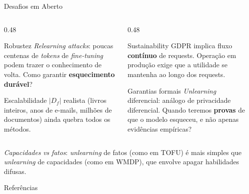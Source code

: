 \documentclass[aspectratio=169,xcolor=dvipsnames]{beamer}
\begin{document}
  \begin{frame}{Desafios em Aberto}
    \begin{columns}[T]
      \begin{column}{0.48\textwidth}
        \begin{block}{Robustez}
          \textit{Relearning attacks}: poucas centenas de \textit{tokens} de \textit{fine-tuning} podem trazer o conhecimento de volta. Como garantir \textbf{esquecimento durável}?
        \end{block}
        \begin{block}{Escalabilidade}
          $|D_f|$ realista (livros inteiros, anos de e-mails, milhões de documentos) ainda quebra todos os métodos.
        \end{block}
      \end{column}
      \begin{column}{0.48\textwidth}
        \begin{block}{Sustainability}
          GDPR implica fluxo \textbf{contínuo} de requests. Operação em produção exige que a utilidade se mantenha ao longo dos requests.
        \end{block}
        \begin{alertblock}{Garantias formais}
          \textit{Unlearning} diferencial: análogo de privacidade diferencial. Quando teremos \textbf{provas} de que o modelo esqueceu, e não apenas evidências empíricas?
        \end{alertblock}
      \end{column}
    \end{columns}

    \vspace{0.4em}
    \footnotesize \textit{Capacidades vs fatos}: \textit{unlearning} de fatos (como em TOFU) é mais simples que \textit{unlearning} de capacidades (como em WMDP), que envolve apagar habilidades difusas.
  \end{frame}

  \begin{frame}[allowframebreaks]{Referências}
    \sloppy
    \printbibliography[heading=none]
  \end{frame}
\end{document}
